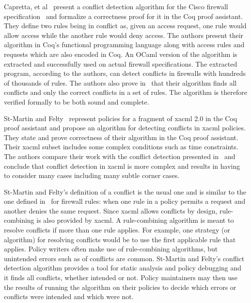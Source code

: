 Capretta, et al~\cite{CaprettaSFM07} present a conflict detection algorithm for the Cisco firewall specification~\cite{ciscofirewall} and formalize a correctness proof for it in the Coq proof assistant. They define two rules being in conflict as, given an access request, one rule would allow access while the another rule would deny access. The authors present their algorithm in Coq's functional programming language along with access rules and requests which are also encoded in Coq. An OCaml version of
the algorithm is extracted and successfully used on actual firewall specifications. The extracted program, according to the authors, can detect conflicts in firewalls with hundreds of thousands of rules. The authors also prove in~\cite{CaprettaSFM07} that their algorithm finds all conflicts and only the correct conflicts in a set of rules. The algorithm is therefore verified formally to be both sound and complete.

St-Martin and Felty~\cite{Stmartin} represent policies for a fragment of \ac{xacml} 2.0 in the Coq proof assistant and propose an algorithm for detecting conflicts in \ac{xacml} policies. They state and prove correctness of their algorithm in the Coq proof assistant. Their \ac{xacml} subset includes some complex conditions such as time constraints. The authors compare their work with the conflict detection presented in~\cite{CaprettaSFM07} and conclude that conflict detection in \ac{xacml} is more complex and results in having to consider many cases including many subtle corner cases. 

St-Martin and Felty's definition of a conflict is the usual one and is similar to the one defined in~\cite{CaprettaSFM07} for firewall rules: when one rule in a policy permits a request and another denies the same request. Since \ac{xacml} allows conflicts by design, rule-combining is also provided by \ac{xacml}. A rule-combining algorithm is meant to resolve conflicts if more than one rule applies. For example, one strategy (or algorithm) for resolving conflicts would be to use the first applicable rule that applies. Policy writers often make use of rule-combining algorithms, but unintended errors such as of conflicts are common.
St-Martin and Felty's conflict detection algorithm provides a tool for static analysis and policy debugging and it finds all conflicts, whether intended or not. Policy maintainers may then use the results of running the algorithm on their policies to decide which errors or conflicts were intended and which were not.





























